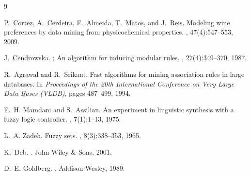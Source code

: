 \documentclass[11pt,a4paper]{article}
\begin{document}

\begin{thebibliography}{9}

P.~Cortez, A.~Cerdeira, F.~Almeida, T.~Matos, and J.~Reis.
\newblock Modeling wine preferences by data mining from physicochemical properties.
, 47(4):547--553, 2009.

J.~Cendrowska.
: An algorithm for inducing modular rules.
, 27(4):349--370, 1987.

R.~Agrawal and R.~Srikant.
\newblock Fast algorithms for mining association rules in large databases.
\newblock In {\em Proceedings of the 20th International Conference on Very Large Data Bases (VLDB)}, pages 487--499, 1994.

E.~H. Mamdani and S.~Assilian.
\newblock An experiment in linguistic synthesis with a fuzzy logic controller.
, 7(1):1--13, 1975.

L.~A. Zadeh.
\newblock Fuzzy sets.
, 8(3):338--353, 1965.

K.~Deb.
.
\newblock John Wiley \& Sons, 2001.

D.~E. Goldberg.
.
\newblock Addison-Wesley, 1989.

\end{thebibliography}
\end{document}
